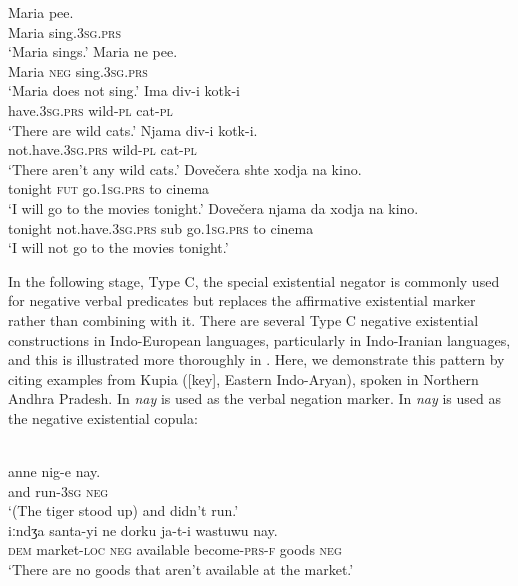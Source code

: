 \documentclass[output=paper,colorlinks,citecolor=brown]{langscibook}
\begin{document}
\begin{exe}\ex\label{ex:ieur-bulgarian-negators}
\begin{xlist}
\ex
    \gll Maria pee. \\
Maria sing.\textsc{3sg}.\textsc{prs} \\
    \glt `Maria sings.'
\ex
\gll Maria ne pee. \\
Maria \textsc{neg} sing.\textsc{3sg}.\textsc{prs} \\
\glt `Maria does not sing.'
\ex\gll Ima div-i kotk-i \\
   have.\textsc{3sg}.\textsc{prs} wild-\textsc{pl} cat-\textsc{pl} \\
\glt `There are wild cats.'
\ex\gll Njama div-i kotk-i. \\
not.have.\textsc{3sg}.\textsc{prs} wild-\textsc{pl} cat-\textsc{pl} \\
\glt `There aren't any wild cats.'
\ex\gll Dovečera shte xodja na kino. \\
tonight     \textsc{fut} go.\textsc{1sg}.\textsc{prs}  to cinema \\
\glt `I will go to the movies tonight.'
\ex\gll Dovečera njama                  da   xodja          na  kino.\\
tonight not.have.\textsc{3sg}.\textsc{prs} sub go.\textsc{1sg.prs} to
cinema \\
\glt `I will not go to the movies tonight.'
    \end{xlist}\end{exe}
%
In the following stage, Type C, the special existential negator is commonly
used for negative verbal predicates but replaces the affirmative
existential marker rather than combining with it. There are several Type C
negative existential constructions in Indo-European languages, particularly
in Indo-Iranian languages, and this is illustrated more thoroughly in
. Here, we demonstrate this pattern by citing
examples from Kupia ([key], Eastern Indo-Aryan), spoken in Northern Andhra
Pradesh. In  \textit{nay} is used as the verbal
negation marker. In  \textit{nay} is used as the negative existential copula:
%
\begin{exe}\ex\begin{xlist}
\ex\label{ex:ieur-kupia-tiger}
\\
    \gll anne nig-e          nay. \\
            and   run-\textsc{3sg}      \textsc{neg} \\
    \glt `(The tiger stood up) and didn't run.'
\ex\label{ex:ieur-kupia-market}
\\
\gll iːndʒa santa-yi ne dorku ja-t-i wastuwu nay.\\
    \textsc{dem}     market-\textsc{loc} \textsc{neg} available
    become-\textsc{prs-f}
goods      \textsc{neg}\\
\glt `There are no goods that aren't available at the market.'
\end{xlist}\end{exe}
\end{document}
